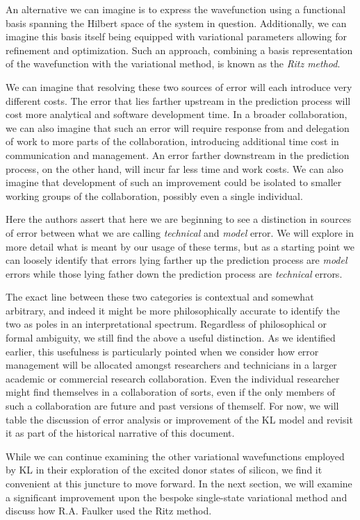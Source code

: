 An alternative we can imagine is to express the wavefunction using a functional
basis spanning the Hilbert space of the system in question. Additionally, we can
imagine this basis itself being equipped with variational parameters allowing
for refinement and optimization. Such an approach, combining a basis
representation of the wavefunction with the variational method, is known as the
\emph{Ritz method}.

We can imagine that resolving these two sources of error will each introduce
very different costs. The error that lies farther upstream in the prediction
process will cost more analytical and software development time. In a broader
collaboration, we can also imagine that such an error will require response from
and delegation of work to more parts of the collaboration, introducing
additional time cost in communication and management. An error farther
downstream in the prediction process, on the other hand, will incur far less
time and work costs. We can also imagine that development of such an improvement
could be isolated to smaller working groups of the collaboration, possibly even
a single individual.

Here the authors assert that here we are beginning to see a distinction in
sources of error between what we are calling \emph{technical} and \emph{model}
error. We will explore in more detail what is meant by our usage of these terms,
but as a starting point we can loosely identify that errors lying farther up the
prediction process are \emph{model} errors while those lying father down the
prediction process are \emph{technical} errors.

The exact line between these two categories is contextual and somewhat
arbitrary, and indeed it might be more philosophically accurate to identify the
two as poles in an interpretational spectrum. Regardless of philosophical or
formal ambiguity, we still find the above a useful distinction. As we identified
earlier, this usefulness is particularly pointed when we consider how error
management will be allocated amongst researchers and technicians in a larger
academic or commercial research collaboration. Even the individual researcher
might find themselves in a collaboration of sorts, even if the only members of
such a collaboration are future and past versions of themself. For now, we will
table the discussion of error analysis or improvement of the KL model and
revisit it as part of the historical narrative of this document.



While we can continue examining the other variational wavefunctions employed by
KL in their exploration of the excited donor states of silicon, we find it
convenient at this juncture to move forward. In the next section, we will
examine a significant improvement upon the bespoke single-state variational
method and discuss how R.A. Faulker used the Ritz method.